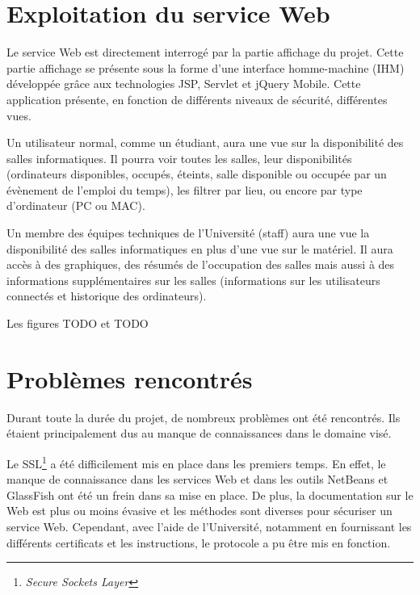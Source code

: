\section{Exploitation du service Web}

Le service Web est directement interrog\'e par la partie affichage du projet.
Cette partie affichage se pr\'esente sous la forme d'une interface homme-machine (IHM) d\'evelopp\'ee gr\^ace aux technologies JSP, Servlet et jQuery Mobile.
Cette application pr\'esente, en fonction de diff\'erents niveaux de s\'ecurit\'e, diff\'erentes vues.

Un utilisateur normal, comme un \'etudiant, aura une vue sur la disponibilit\'e des salles informatiques.
Il pourra voir toutes les salles, leur disponibilit\'es (ordinateurs disponibles, occup\'es, \'eteints, salle disponible ou occup\'ee par un \'ev\`enement de l'emploi du temps), les filtrer par lieu, ou encore par type d'ordinateur (PC ou MAC).

Un membre des \'equipes techniques de l'Universit\'e (staff) aura une vue la disponibilit\'e des salles informatiques en plus d'une vue sur le mat\'eriel.
Il aura acc\`es \`a des graphiques, des r\'esum\'es de l'occupation des salles mais aussi \`a des informations suppl\'ementaires sur les salles (informations sur les utilisateurs connect\'es et historique des ordinateurs).

Les figures TODO et TODO


\section{Probl\`emes rencontr\'es}

Durant toute la dur\'ee du projet, de nombreux probl\`emes ont \'et\'e rencontr\'es.
Ils \'etaient principalement dus au manque de connaissances dans le domaine vis\'e.

Le SSL\protect\footnote{\textit{Secure Sockets Layer}} a \'et\'e difficilement mis en place dans les premiers temps.
En effet, le manque de connaissance dans les services Web et dans les outils NetBeans et GlassFish ont \'et\'e un frein dans sa mise en place.
De plus, la documentation sur le Web est plus ou moins \'evasive et les m\'ethodes sont diverses pour s\'ecuriser un service Web.
Cependant, avec l'aide de l'Universit\'e, notamment en fournissant les diff\'erents certificats et les instructions, le protocole a pu \^etre mis en fonction.


